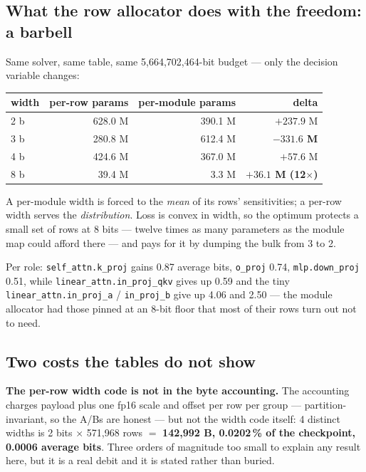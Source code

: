 \documentclass[11pt]{article}
\newcommand{\x}{\texorpdfstring{$\times$}{x}}
\newcommand{\pct}{\,\%}
\newcommand{\code}[1]{\texttt{#1}}
\newcommand{\best}[1]{\textbf{#1}}
\begin{document}
\subsection{What the row allocator does with the freedom: a barbell}

Same solver, same table, same 5{,}664{,}702{,}464-bit budget --- only the decision variable
changes:

\begin{center}\small
\begin{tabular}{@{}lrrr@{}}
\toprule
width & per-row params & per-module params & delta \\
\midrule
2 b & 628.0 M & 390.1 M & $+237.9$ M \\
3 b & 280.8 M & 612.4 M & \best{$-331.6$ M} \\
4 b & 424.6 M & 367.0 M & $+57.6$ M \\
8 b & 39.4 M & 3.3 M & \best{$+36.1$ M (12\x)} \\
\bottomrule
\end{tabular}
\end{center}

A per-module width is forced to the \emph{mean} of its rows' sensitivities; a per-row width serves
the \emph{distribution}. Loss is convex in width, so the optimum protects a small set of rows at 8
bits --- twelve times as many parameters as the module map could afford there --- and pays for it
by dumping the bulk from 3 to 2.

Per role: \code{self\_attn.k\_proj} gains 0.87 average bits, \code{o\_proj} 0.74,
\code{mlp.down\_proj} 0.51, while \code{linear\_attn.in\_proj\_qkv} gives up 0.59 and the tiny
\code{linear\_attn.in\_proj\_a} / \code{in\_proj\_b} give up 4.06 and 2.50 --- the module allocator
had those pinned at an 8-bit floor that most of their rows turn out not to need.

\subsection{Two costs the tables do not show}

\textbf{The per-row width code is not in the byte accounting.} The accounting charges payload plus
one fp16 scale and offset per row per group --- partition-invariant, so the A/Bs are honest --- but
not the width code itself: 4 distinct widths is 2 bits $\times$ 571{,}968 rows $=$
\textbf{142{,}992 B, 0.0202\pct{} of the checkpoint, 0.0006 average bits}. Three orders of
magnitude too small to explain any result here, but it is a real debit and it is stated rather than
buried.
\end{document}
